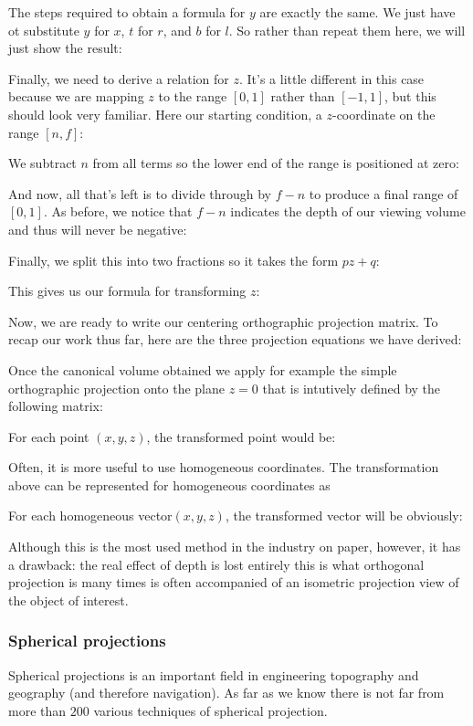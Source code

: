 	The steps required to obtain a formula for $y$ are exactly the same. We just have ot substitute $y$ for $x$, $t$ for $r$, and $b$ for $l$. So rather than repeat them here, we will just show the result:
	
	Finally, we need to derive a relation for $z$. It's a little different in this case because we are mapping $z$ to the range $[0, 1]$ rather than $[-1, 1]$, but this should look very familiar. Here our starting condition, a $z$-coordinate on the range $[n, f]$:
	
	We subtract $n$ from all terms so the lower end of the range is positioned at zero:
	
	And now, all that's left is to divide through by $f - n$ to produce a final range of $[0, 1]$. As before, we notice that $f - n$ indicates the depth of our viewing volume and thus will never be negative:
	
	Finally, we split this into two fractions so it takes the form $pz + q$:
	
	This gives us our formula for transforming $z$:
	
	Now, we are ready to write our centering orthographic projection matrix. To recap our work thus far, here are the three projection equations we have derived:
	
	Once the canonical volume obtained we apply for example the simple orthographic projection onto the plane $z = 0$ that is intutively defined by the following matrix:
	
	For each point $(x, y, z)$, the transformed point would be:
	
	Often, it is more useful to use homogeneous coordinates. The transformation above can be represented for homogeneous coordinates as
	
	For each homogeneous vector$(x,y,z)$, the transformed vector will be obviously:
	
	Although this is the most used method in the industry on paper, however, it has a drawback: the real effect of depth is lost entirely this is what orthogonal projection is many times is often accompanied of an isometric projection view of the object of interest.
	
	\pagebreak
	\subsubsection{Spherical projections}
	Spherical projections is an important field in engineering topography and geography (and therefore navigation). As far as we know there is not far from more than $200$ various techniques of spherical projection. 
	

